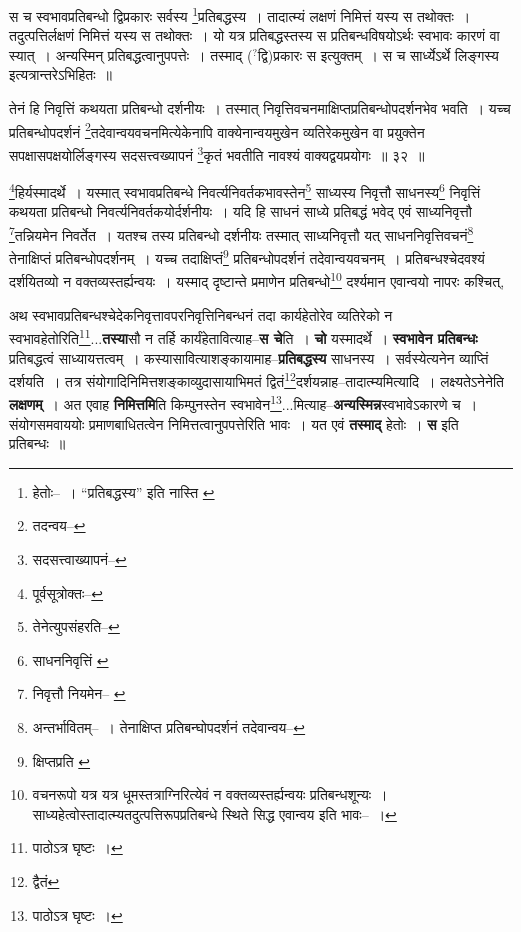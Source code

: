 \documentclass[article,12pt,a4paper]{memoir}
\newcommand{\unclear}[1]{($^{?}$#1)}
\begin{document}
	  \pstart स च स्वभावप्रतिबन्धो द्विप्रकारः सर्वस्य \footnote{हेतोः--\cite{dp-msD-n} । “प्रतिबद्धस्य” इति नास्ति \cite{dp-msA} \cite{dp-edP} \cite{dp-edH}}\-प्रतिबद्धस्य । तादात्म्यं लक्षणं निमित्तं यस्य स तथोक्तः । तदुत्पत्तिर्लक्षणं निमित्तं यस्य स तथोक्तः । यो यत्र प्रतिबद्धस्तस्य स प्रतिबन्धविषयोऽर्थः स्वभावः कारणं वा स्यात् । अन्यस्मिन् प्रतिबद्धत्वानुपपत्तेः । तस्माद् \unclear{द्वि}प्रकारः स इत्युक्तम् । स च सार्ध्येऽर्थे लिङ्गस्य इत्यत्रान्तरेऽभिहितः ॥
	\pend
       
	  \bigskip
	  \begingroup
	

	  \pstart तेनं हि निवृत्तिं कथयता प्रतिबन्धो दर्शनीयः । तस्मात् निवृत्तिवचनमाक्षिप्तप्रतिबन्धोपदर्शनभेव भवति । यच्च प्रतिबन्धोपदर्शनं \footnote{तदन्वय--\cite{dp-msC}}\-तदेवान्वयवचनमित्येकेनापि वाक्येनान्वयमुखेन व्यतिरेकमुखेन वा प्रयुक्तेन सपक्षासपक्षयोर्लिङ्गस्य सदसत्त्वख्यापनं \footnote{सदसत्त्वाख्यापनं--\cite{dp-msC}}\-कृतं भवतीति नावश्यं वाक्यद्वयप्रयोगः ॥ ३२ ॥
	\pend
      
	  \endgroup
	 

	  \pstart \footnote{पूर्वसूत्रोक्तः--\cite{dp-msD-n}}\-हिर्यस्मादर्थे । यस्मात् स्वभावप्रतिबन्धे निवर्त्यनिवर्तकभावस्तेन\footnote{तेनेत्युपसंहरति--\cite{dp-msD-n}} साध्यस्य निवृत्तौ साधनस्य\footnote{साधननिवृत्तिं \cite{dp-msC} \cite{dp-msD}} निवृत्तिं कथयता प्रतिबन्धो निवर्त्यनिवर्तकयोर्दर्शनीयः । यदि हि साधनं साध्ये प्रतिबद्धं भवेद् एवं साध्यनिवृत्तौ \footnote{निवृत्तौ नियमेन--\cite{dp-msB} \cite{dp-msC} \cite{dp-msD}}\-तन्नियमेन निवर्तेत । यतश्च तस्य प्रतिबन्धो दर्शनीयः तस्मात् साध्यनिवृत्तौ यत् साधननिवृत्तिवचनं\footnote{अन्तर्भावितम्--\cite{dp-msD-n} । तेनाक्षिप्त प्रतिबन्घोपदर्शनं तदेवान्वय--\cite{dp-msB}} तेनाक्षिप्तं प्रतिबन्धोपदर्शनम् । यच्च तदाक्षिप्तं\footnote{क्षिप्तप्रति \cite{dp-msA} \cite{dp-edP} \cite{dp-edH} \cite{dp-edE} \cite{dp-edN}} प्रतिबन्धोपदर्शनं तदेवान्वयवचनम् । प्रतिबन्धश्चेदवश्यं दर्शयितव्यो न वक्तव्यस्तर्ह्यन्वयः । यस्माद् दृष्टान्ते प्रमाणेन प्रतिबन्धो\footnote{वचनरूपो यत्र यत्र धूमस्तत्राग्निरित्येवं न वक्तव्यस्तर्ह्यन्वयः प्रतिबन्धशून्यः । साध्यहेत्वोस्तादात्म्यतदुत्पत्तिरूपप्रतिबन्धे स्थिते सिद्ध एवान्वय इति भावः--\cite{dp-msD-n} ।} दर्श्यमान एवान्वयो नापरः कश्चित्,
	\pend
      
	  \endgroup
	

	  \pstart अथ स्वभावप्रतिबन्धश्चेदेकनिवृत्तावपरनिवृत्तिनिबन्धनं तदा कार्यहेतोरेव व्यतिरेको न स्वभावहेतो\leavevmode{}रिति\footnote{पाठोऽत्र घृष्टः ।}\-...\textbf{तस्या}सौ न तर्हि कार्यंहेतावित्याह--\textbf{स चे}ति । \textbf{चो} यस्मादर्थे । \textbf{स्वभावेन प्रतिबन्धः} प्रतिबद्धत्वं साध्यायत्तत्वम् । कस्यासावित्याशङ्कायामाह--\textbf{प्रतिबद्धस्य} साधनस्य । सर्वस्येत्यनेन व्याप्तिं दर्शयति । तत्र संयोगादिनिमित्तशङ्काव्युदासायाभिमतं द्वितं\footnote{द्वैतं}\-दर्शयन्नाह--तादात्म्यमित्यादि । लक्ष्यतेऽनेनेति \textbf{लक्षणम्} । अत एवाह \textbf{निमित्तमि}ति किम्पुनस्तेन स्वभावेन\footnote{पाठोऽत्र घृष्टः ।}\-...मित्याह--\textbf{अन्यस्मिन्न}स्वभावेऽकारणे च । संयोगसमवाययोः प्रमाणबाधितत्वेन निमित्तत्वानुपपत्तेरिति भावः । यत एवं \textbf{तस्माद्} हेतोः । \textbf{स} इति प्रतिबन्धः ॥
	\pend
      
\end{document}
